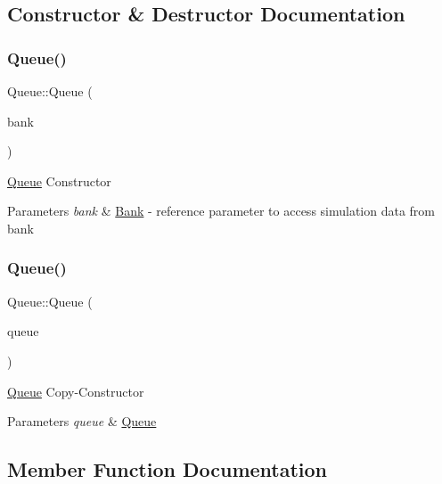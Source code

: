 \subsection{Constructor \& Destructor Documentation}
\mbox{\label{classQueue_ae2647f6001471e160dc95362aba43313}} 
\subsubsection{\texorpdfstring{Queue()}{Queue()}\hspace{0.1cm}{\footnotesize\ttfamily [1/2]}}
{\footnotesize\ttfamily Queue\+::\+Queue (\begin{DoxyParamCaption}\item[{\hyperlink{classBank}{Bank} \&}]{bank }\end{DoxyParamCaption})\hspace{0.3cm}{\ttfamily [explicit]}}

\hyperlink{classQueue}{Queue} Constructor 
\begin{DoxyParams}{Parameters}
{\em bank} & \hyperlink{classBank}{Bank} -\/ reference parameter to access simulation data from bank \\
\hline
\end{DoxyParams}
\mbox{\label{classQueue_a4d325dcdfe0550824d529b7aa11535b8}} 
\subsubsection{\texorpdfstring{Queue()}{Queue()}\hspace{0.1cm}{\footnotesize\ttfamily [2/2]}}
{\footnotesize\ttfamily Queue\+::\+Queue (\begin{DoxyParamCaption}\item[{const \hyperlink{classQueue}{Queue} \&}]{queue }\end{DoxyParamCaption})}

\hyperlink{classQueue}{Queue} Copy-\/\+Constructor 
\begin{DoxyParams}{Parameters}
{\em queue} & \hyperlink{classQueue}{Queue} \\
\hline
\end{DoxyParams}


\subsection{Member Function Documentation}
\mbox{\label{classQueue_aa4545b1d42237801b75e0f20c3cc0587}} 

